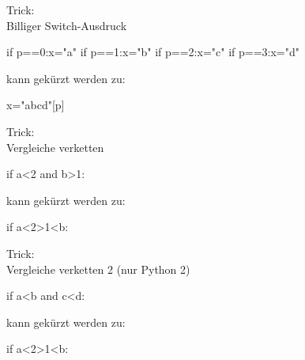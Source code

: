 \documentclass[xcolor=dvipsnames, aspectratio=43, 14pt]{beamer}
\begin{document}
\begin{frame}[fragile]{Trick:\\ Billiger Switch-Ausdruck}
	\begin{python3code}
	if p==0:x="a"
	if p==1:x="b"
	if p==2:x="c"
	if p==3:x="d"
	\end{python3code}
	
	\vfill
	
	kann gekürzt werden zu:
	
	\vfill
	
	\begin{python3code}
	x="abcd"[p]
	\end{python3code}
\end{frame}

\begin{frame}[fragile]{Trick:\\ Vergleiche verketten}
	\begin{python3code}
	if a<2 and b>1:
	\end{python3code}
	
	\vfill
	
	kann gekürzt werden zu:
	
	\vfill
	
	\begin{python3code}
	if a<2>1<b:
	\end{python3code}
\end{frame}

\begin{frame}[fragile]{Trick:\\ Vergleiche verketten 2}
	(nur Python 2)
	
	\begin{python3code}
	if a<b and c<d:
	\end{python3code}
	
	\vfill
	
	kann gekürzt werden zu:
	
	\vfill
	
	\begin{python3code}
	if a<2>1<b:
	\end{python3code}
\end{frame}
\end{document}
